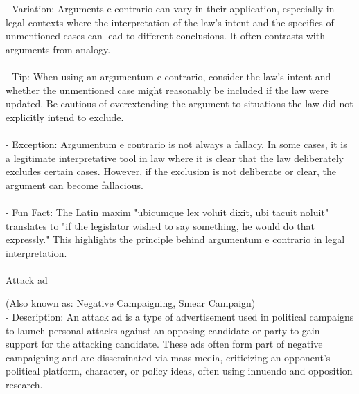 \documentclass[a4paper,12pt,single,pdftex]{scrartcl}
\begin{document}
    
      - Variation: Arguments e contrario can vary in their application, especially in legal contexts where the interpretation of the law's intent and the specifics of unmentioned cases can lead to different conclusions. It often contrasts with arguments from analogy.
    \\

    
      
    \\

    
      - Tip: When using an argumentum e contrario, consider the law's intent and whether the unmentioned case might reasonably be included if the law were updated. Be cautious of overextending the argument to situations the law did not explicitly intend to exclude.
    \\

    
      
    \\

    
      - Exception: Argumentum e contrario is not always a fallacy. In some cases, it is a legitimate interpretative tool in law where it is clear that the law deliberately excludes certain cases. However, if the exclusion is not deliberate or clear, the argument can become fallacious.
    \\

    
      
    \\

    
      - Fun Fact: The Latin maxim "ubicumque lex voluit dixit, ubi tacuit noluit" translates to "if the legislator wished to say something, he would do that expressly." This highlights the principle behind argumentum e contrario in legal interpretation.
    \\

    
      
    \\

  

Attack ad
    
      (Also known as: Negative Campaigning, Smear Campaign)
    \\

  
    
      - Description: An attack ad is a type of advertisement used in political campaigns to launch personal attacks against an opposing candidate or party to gain support for the attacking candidate. These ads often form part of negative campaigning and are disseminated via mass media, criticizing an opponent's political platform, character, or policy ideas, often using innuendo and opposition research.
    \\
\end{document}
